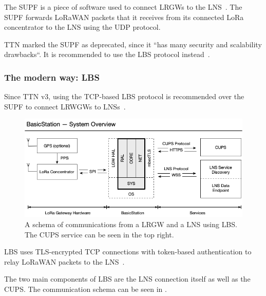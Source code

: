 The \ac{SUPF} is a piece of software used to connect \aclp{LRGW} to the \ac{LNS}~\cite{the_things_industries_bv_semtech_2022}.
The \ac{SUPF} forwards \ac{LoRaWAN} packets that it receives from its connected \ac{LoRa} concentrator to the \ac{LNS} using the \ac{UDP} protocol.

\ac{TTN} marked the \acl{SUPF} as deprecated, since it ``has many security and scalability drawbacks``.
It is recommended to use the \ac{LBS} protocol instead~\cite{the_things_industries_bv_semtech_2022}.

\subsubsection{The modern way: \acl{LBS}}\label{sec:lorawan-lbs}

Since \ac{TTN} v3, using the \ac{TCP}-based \acl{LBS} protocol is recommended over the \ac{SUPF} to connect \aclp{LRWGW} to \aclp{LNS}~\cite{the_things_industries_bv_semtech_2022}.

\begin{figure}[htbp]
    \centering
    \includegraphics[width=1\textwidth]{pictures/lorawan-structure/lora-basics-station-structure.png}
    \caption[Schema of communications from a \acl{LRGW} and a \acl{LNS} using \acl{LBS}]{
        A schema of communications from a \acl{LRGW} and a \ac{LNS} using \acf{LBS}.
        The \ac{CUPS} service can be seen in the top right.~\protect\cite{semtech_lora_developer_portal_lora_2022}
    }\label{pic:lora-basics-station-schema}
\end{figure}

\ac{LBS} uses \ac{TLS}-encrypted \ac{TCP} connections with token-based authentication to relay \ac{LoRaWAN} packets to the \ac{LNS}~\cite{the_things_industries_bv_lora_2022}.

The two main components of \acl{LBS} are the \ac{LNS} connection itself as well as the \acf{CUPS}.
The communication schema can be seen in .


